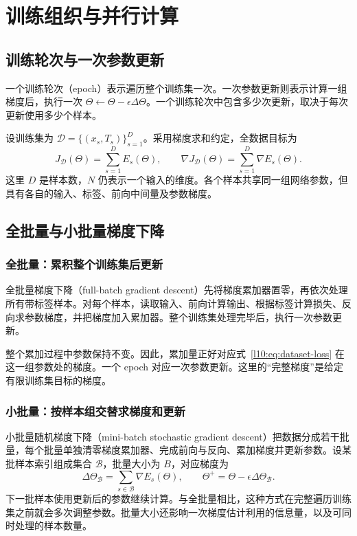 \section{训练组织与并行计算}
\subsection{训练轮次与一次参数更新}

一个训练轮次（epoch）表示遍历整个训练集一次。一次参数更新则表示计算一组梯度后，执行一次 $\Theta\leftarrow\Theta-\epsilon\Delta\Theta$。一个训练轮次中包含多少次更新，取决于每次更新使用多少个样本。

设训练集为 $\mathcal D=\{(x_s,T_s)\}_{s=1}^{D}$。采用梯度求和约定，全数据目标为
\begin{equation}
 J_{\mathcal D}(\Theta)=\sum_{s=1}^{D}E_s(\Theta),\qquad
 \nabla J_{\mathcal D}(\Theta)=\sum_{s=1}^{D}\nabla E_s(\Theta).
 \label{l10:eq:dataset-loss}
\end{equation}
这里 $D$ 是样本数，$N$ 仍表示一个输入的维度。各个样本共享同一组网络参数，但具有各自的输入、标签、前向中间量及参数梯度。

\subsection{全批量与小批量梯度下降}

\subsubsection{全批量：累积整个训练集后更新}
全批量梯度下降（full-batch gradient descent）先将梯度累加器置零，再依次处理所有带标签样本。对每个样本，读取输入、前向计算输出、根据标签计算损失、反向求参数梯度，并把梯度加入累加器。整个训练集处理完毕后，执行一次参数更新。

整个累加过程中参数保持不变。因此，累加量正好对应式~\eqref{l10:eq:dataset-loss} 在这一组参数处的梯度。一个 epoch 对应一次参数更新。这里的“完整梯度”是给定有限训练集目标的梯度。

\subsubsection{小批量：按样本组交替求梯度和更新}
小批量随机梯度下降（mini-batch stochastic gradient descent）把数据分成若干批量，每个批量单独清零梯度累加器、完成前向与反向、累加梯度并更新参数。设某批样本索引组成集合 $\mathcal B$，批量大小为 $B$，对应梯度为
\begin{equation}
 \Delta\Theta_{\mathcal B}=\sum_{s\in\mathcal B}\nabla E_s(\Theta),
 \qquad\Theta^+=\Theta-\epsilon\Delta\Theta_{\mathcal B}.
 \label{l10:eq:batch-update}
\end{equation}
下一批样本使用更新后的参数继续计算。与全批量相比，这种方式在完整遍历训练集之前就会多次调整参数。批量大小还影响一次梯度估计利用的信息量，以及可同时处理的样本数量。

